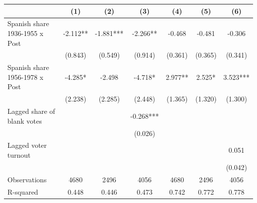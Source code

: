 \begin{table}
\centering
\begin{tabular}[t]{lcccccc}
\toprule
  & (1) & (2) & (3) & (4) & (5) & (6)\\
\midrule
Spanish share 1936-1955 x Post & -2.112** & -1.881*** & -2.266** & -0.468 & -0.481 & -0.306\\
 & (0.843) & (0.549) & (0.914) & (0.361) & (0.365) & (0.341)\\
Spanish share 1956-1978 x Post & -4.285* & -2.498 & -4.718* & 2.977** & 2.525* & 3.523***\\
 & (2.238) & (2.285) & (2.448) & (1.365) & (1.320) & (1.300)\\
Lagged share of blank votes &  &  & -0.268*** &  &  & \\
 &  &  & (0.026) &  &  & \\
Lagged voter turnout &  &  &  &  &  & 0.051\\
 &  &  &  &  &  & (0.042)\\
\midrule
Observations & 4680 & 2496 & 4056 & 4680 & 2496 & 4056\\
R-squared & 0.448 & 0.446 & 0.473 & 0.742 & 0.772 & 0.778\\
\bottomrule
\end{tabular}
\end{table}
